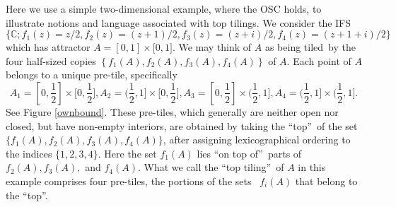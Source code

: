 \documentclass{amsproc}%
\theoremstyle{plain}
\theoremstyle{definition}
\numberwithin{equation}{section}
\begin{document}
Here we use a simple two-dimensional example, where the OSC holds, to
illustrate notions and language associated with top tilings. We consider the
IFS
\begin{equation}
\{\mathbb{C};f_{1}(z)=z/2,f_{2}(z)=(z+1)/2,f_{3}(z)=(z+i)/2,f_{4}%
(z)=(z+1+i)/2\} \label{eqifs1}%
\end{equation}
which has attractor $A=[0,1]\times\lbrack0,1].$ We may think of $A$ as being
tiled\ by the four half-sized copies $\left\{  f_{1}(A),f_{2}(A),f_{3}%
(A),f_{4}(A)\right\}  $ of $A.$ Each point of $A$ belongs to a unique
pre-tile, specifically
\[
A_{1}=[0,\frac{1}{2}]\times\lbrack0,\frac{1}{2}],A_{2}=(\frac{1}{2}%
,1]\times\lbrack0,\frac{1}{2}],A_{3}=[0,\frac{1}{2}]\times(\frac{1}%
{2},1],A_{4}=(\frac{1}{2},1]\times(\frac{1}{2},1].
\]
See Figure \ref{ownbound}. These pre-tiles, which generally are neither open
nor closed, but have non-empty interiors, are obtained by taking the
\textquotedblleft top\textquotedblright\ of the set $\{f_{1}(A),f_{2}%
(A),f_{3}(A),f_{4}(A)\}$, after assigning lexicographical ordering to the
indices $\{1,2,3,4\}$. Here the set $f_{1}(A)$ lies \textquotedblleft on top
of\textquotedblright\ parts of $f_{2}(A),f_{3}(A),$ and $f_{4}(A)$. What we
call the \textquotedblleft top tiling\textquotedblright\ of $A$ in this
example comprises four pre-tiles, the portions of the sets \ $f_{i}(A)$ that
belong to the \textquotedblleft top\textquotedblright.
\end{document}
